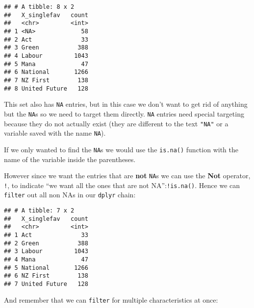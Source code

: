 \documentclass[]{article}
\newenvironment{Shaded}{\begin{snugshade}}{\end{snugshade}}
\newcommand{\KeywordTok}[1]{\textcolor[rgb]{0.13,0.29,0.53}{\textbf{#1}}}
\newcommand{\DataTypeTok}[1]{\textcolor[rgb]{0.13,0.29,0.53}{#1}}
\newcommand{\StringTok}[1]{\textcolor[rgb]{0.31,0.60,0.02}{#1}}
\newcommand{\OperatorTok}[1]{\textcolor[rgb]{0.81,0.36,0.00}{\textbf{#1}}}
\newcommand{\NormalTok}[1]{#1}
\begin{document}
\begin{verbatim}
## # A tibble: 8 x 2
##   X_singlefav   count
##   <chr>         <int>
## 1 <NA>             58
## 2 Act              33
## 3 Green           388
## 4 Labour         1043
## 5 Mana             47
## 6 National       1266
## 7 NZ First        138
## 8 United Future   128
\end{verbatim}

This set also has \texttt{NA} entries, but in this case we don't want to
get rid of anything but the \texttt{NA}s so we need to target them
directly. \texttt{NA} entries need special targeting because they do not
actually exist (they are different to the text \texttt{"NA"} or a
variable saved with the name \texttt{NA}).

If we only wanted to find the \texttt{NA}s we would use the
\texttt{is.na()} function with the name of the variable inside the
parentheses.

However since we want the entries that are \textbf{not} \texttt{NA}s we
can use the \textbf{Not} operator, \texttt{!}, to indicate ``we want all
the ones that are not NA'':\texttt{!is.na()}. Hence we can
\texttt{filter} out all non NAs in our \texttt{dplyr} chain:

\begin{Shaded}
\end{Shaded}

\begin{verbatim}
## # A tibble: 7 x 2
##   X_singlefav   count
##   <chr>         <int>
## 1 Act              33
## 2 Green           388
## 3 Labour         1043
## 4 Mana             47
## 5 National       1266
## 6 NZ First        138
## 7 United Future   128
\end{verbatim}

And remember that we can \texttt{filter} for multiple characteristics at
once:

\begin{Shaded}
\end{Shaded}
\end{document}
